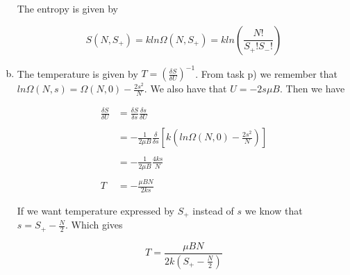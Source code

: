 \documentclass[a4paper,norsk,12pt,oneside]{article}
\begin{document}
\begin{enumerate}[a)]
        The entropy is given by

        \begin{equation*}
            S(N,S_+) = kln\Omega(N, S_+) = k ln\left ( \frac{N!}{S_+! S_-!} \right )
        \end{equation*}

    \item

        The temperature is given by \(T = \left (\frac{\delta S}{\delta U} \right)^{-1} \). 
        From 
        task p) we remember that \(ln\Omega(N,s) = \Omega(N,0) - \frac{
        2s^2}{N} \). We also have that \(U = -2s \mu B\). Then we have

        \begin{align*}
            \frac{\delta S}{\delta U} &= \frac{\delta S}{\delta s} \frac{\delta s}{\delta 
            U}\\ \\
            &= - \frac{1}{2 \mu B} \frac{\delta}{\delta s} \left [k \left ( ln\Omega(N,0)
            - \frac{2s^2}{N} \right ) \right ] \\\\
            &= -\frac{1}{2 \mu B} \frac{4ks}{N} \\\\
            T &= - \frac{\mu BN}{2ks}
        \end{align*}

        If we want temperature expressed by \(S_+\) instead of \(s\) we know that 
        \(s = S_+ - \frac{N}{2}\). Which gives

        \begin{equation*}
            T = \frac{\mu BN}{2k\left (S_+ - \frac{N}{2}\right )}
        \end{equation*}

    \end{enumerate}
\end{document}
